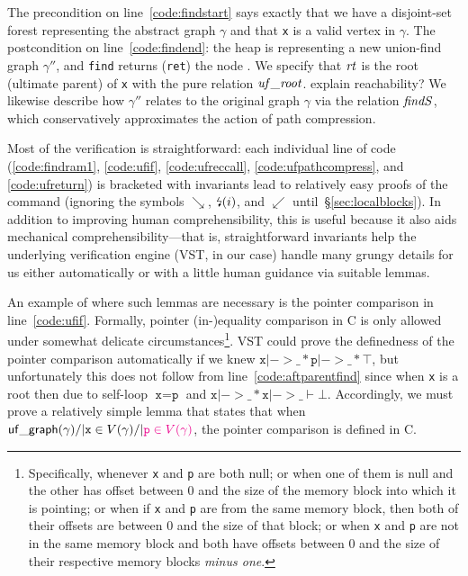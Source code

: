 The precondition on line~\ref{code:findstart} says exactly that we have a disjoint-set forest representing the abstract graph $\gamma$ and that \texttt{x} is a valid vertex in $\gamma$.  The postcondition on line~\ref{code:findend}: the heap is representing a new union-find graph $\gamma''$, and \texttt{find} returns (\texttt{ret}) the node .  We specify that $\mathit{rt}$
is the root (ultimate parent) of \texttt{x} with the pure relation $\mathit{uf\_root}$.  {\color{magenta} explain reachability?} We likewise describe how $\gamma''$ relates to the original graph $\gamma$ via the relation $\mathit{findS}$, which conservatively approximates the action of path compression.

Most of the verification is straightforward: each individual line of code (\ref{code:findram1}, \ref{code:ufif}, \ref{code:ufreccall}, \ref{code:ufpathcompress}, and \ref{code:ufreturn}) is bracketed with invariants lead to relatively easy proofs of the command (ignoring the symbols $\searrow$, $\mbox{\lightning}(i)$, and $\swarrow$ until~\S\ref{sec:localblocks}).  In addition to improving human comprehensibility, this is useful because it also aids mechanical comprehensibility---that is, straightforward invariants help the underlying verification engine (VST, in our case) handle many grungy details for us either automatically or with a little human guidance via suitable lemmas.

An example of where such lemmas are necessary is the pointer comparison in line~\ref{code:ufif}.
Formally, pointer (in-)equality comparison in C is only allowed under somewhat delicate circumstances\footnote {\label{footnote:pointereq}Specifically, whenever \texttt{x} and \texttt{p} are both null; or when one of them is null and the other has offset between 0 and the size of the memory block into which it is pointing; or when if \texttt{x} and \texttt{p} are from the same memory block, then both of their offsets are between 0 and the size of that block; or when \texttt{x} and \texttt{p} are not in the same memory block and both have offsets between 0 and the size of their respective memory blocks \emph{minus one}.}.  VST could prove the definedness of the pointer comparison automatically if we knew $\texttt{x} |-> \_ * \texttt{p} |-> \_ * \top$, but
unfortunately this does not follow from line~\ref{code:aftparentfind} since when \texttt{x} is a root then due to self-loop $\texttt{x}=\texttt{p}$ and $\texttt{x} |-> \_ * \texttt{x} |-> \_ \vdash \bot$.  Accordingly, we must prove a relatively simple lemma that states that when $\mathsf{uf\_graph}(\gamma) /| \texttt{x} \in V(\gamma) /| {\color{magenta} \texttt{p} \in V(\gamma)}$,
the pointer comparison is defined in C.

